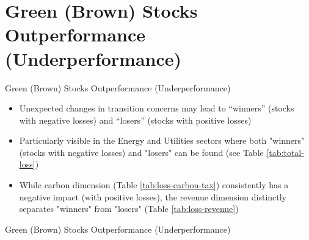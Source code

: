 \documentclass{beamer}
\begin{document}
\section{Green (Brown) Stocks Outperformance (Underperformance)}

\begin{frame}{Green (Brown) Stocks Outperformance (Underperformance)}
  \begin{itemize}
    \item Unexpected changes in transition concerns
          may lead to “winners” (stocks with negative losses)
          and “losers” (stocks with positive losses)
    \item Particularly visible in the Energy and Utilities sectors where both "winners" (stocks with negative losses) and "losers" can be found (see Table \ref{tab:total-loss})
    \item While carbon dimension (Table \ref{tab:loss-carbon-tax}) consistently has a negative impact (with positive losses), the revenue dimension distinctly separates "winners" from "losers" (Table \ref{tab:loss-revenue})
  \end{itemize}


\end{frame}


\begin{frame}{Green (Brown) Stocks Outperformance (Underperformance)}
  \begin{table}
    \centering
    \small
    \caption{Summary statistics by sector: total loss}
    \label{tab:total-loss}
  \end{table}
\end{frame}
\end{document}

